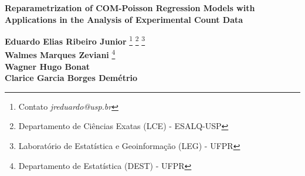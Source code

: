 \documentclass[12pt, a4paper]{article}
\begin{document}
\onehalfspacing

\begin{center}
\begin{center}
\textbf{\Large{Reparametrization of COM-Poisson Regression Models with
    Applications in the Analysis of Experimental Count Data}}\\[1em]
\end{center}
\end{center}
\vspace*{0.2cm}

\begin{flushright}
  {\bf Eduardo Elias Ribeiro Junior}
  \footnote[$\dagger$]{Contato \textit{jreduardo@usp.br}}
  \footnote[1]{Departamento de Ciências Exatas (LCE) - ESALQ-USP}
  \footnote[3]{Laboratório de Estatística e Geoinformação (LEG) -
    UFPR}\\
  {\bf Walmes Marques Zeviani} \footnote[2]{
    Departamento de Estatística (DEST) - UFPR} \footnotemark[3]\\
  {\bf Wagner Hugo Bonat} \footnotemark[2] \footnotemark[3]\\
  {\bf Clarice Garcia Borges Demétrio} \footnotemark[1]
\end{flushright}

\vspace*{0.5cm}

\end{document}
